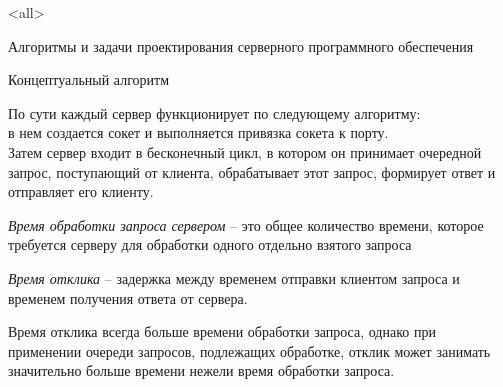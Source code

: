 

\subtitle{Модель сетевого взаимодействия клиент-сервер}



\mode<all>{}

%
%

\begin{frame}{}
	\Huge
	\begin{center}
		Алгоритмы и задачи проектирования серверного программного обеспечения
	\end{center}
\end{frame}

\begin{frame}{Концептуальный алгоритм}

	По сути каждый сервер функционирует по следующему алгоритму: \\
в нем создается сокет и выполняется привязка сокета к порту. \\
Затем сервер входит в бесконечный цикл,  в котором он принимает очередной запрос,  поступающий от клиента,  обрабатывает этот запрос,  формирует ответ и отправляет его клиенту. 
\end{frame}

\begin{frame}{}

	{\itshape Время обработки запроса сервером} -- это общее количество времени,  которое требуется серверу для обработки одного отдельно взятого запроса
	
	{\itshape Время отклика} -- задержка между временем отправки клиентом запроса и временем получения ответа от сервера.

	\bigskip	
	Время отклика всегда больше времени обработки запроса,  однако при применении очереди запросов,  подлежащих обработке,  отклик может занимать  значительно больше времени нежели время обработки запроса. 
\end{frame}

